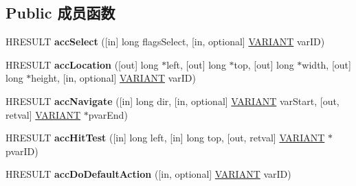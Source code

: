 \subsection*{Public 成员函数}
\begin{DoxyCompactItemize}
\item 
\mbox{\label{interface_i_accessible_aae174f4f5760b4878ac13257d7f332ae}} 
H\+R\+E\+S\+U\+LT {\bfseries acc\+Select} (\mbox{[}in\mbox{]} long flags\+Select, \mbox{[}in, optional\mbox{]} \hyperlink{structtag_v_a_r_i_a_n_t}{V\+A\+R\+I\+A\+NT} var\+ID)
\item 
\mbox{\label{interface_i_accessible_a31e8fcad8b3b123237881248c21017ed}} 
H\+R\+E\+S\+U\+LT {\bfseries acc\+Location} (\mbox{[}out\mbox{]} long $\ast$left, \mbox{[}out\mbox{]} long $\ast$top, \mbox{[}out\mbox{]} long $\ast$width, \mbox{[}out\mbox{]} long $\ast$height, \mbox{[}in, optional\mbox{]} \hyperlink{structtag_v_a_r_i_a_n_t}{V\+A\+R\+I\+A\+NT} var\+ID)
\item 
\mbox{\label{interface_i_accessible_a0dff12963abafcaad17ac9a23aa3ad65}} 
H\+R\+E\+S\+U\+LT {\bfseries acc\+Navigate} (\mbox{[}in\mbox{]} long dir, \mbox{[}in, optional\mbox{]} \hyperlink{structtag_v_a_r_i_a_n_t}{V\+A\+R\+I\+A\+NT} var\+Start, \mbox{[}out, retval\mbox{]} \hyperlink{structtag_v_a_r_i_a_n_t}{V\+A\+R\+I\+A\+NT} $\ast$pvar\+End)
\item 
\mbox{\label{interface_i_accessible_a3ed63d11f7fd2891b300a7302069aba6}} 
H\+R\+E\+S\+U\+LT {\bfseries acc\+Hit\+Test} (\mbox{[}in\mbox{]} long left, \mbox{[}in\mbox{]} long top, \mbox{[}out, retval\mbox{]} \hyperlink{structtag_v_a_r_i_a_n_t}{V\+A\+R\+I\+A\+NT} $\ast$pvar\+ID)
\item 
\mbox{\label{interface_i_accessible_a6f2886f9d33166e9026c3df73faf26bc}} 
H\+R\+E\+S\+U\+LT {\bfseries acc\+Do\+Default\+Action} (\mbox{[}in, optional\mbox{]} \hyperlink{structtag_v_a_r_i_a_n_t}{V\+A\+R\+I\+A\+NT} var\+ID)
\end{DoxyCompactItemize}
